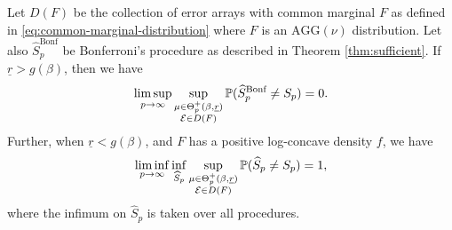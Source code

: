 \begin{corollary}
\label{cor:minimax-over-dependence}
Let $D(F)$ be the collection of error arrays with common marginal $F$ as defined in \eqref{eq:common-marginal-distribution} where $F$ is an $\text{AGG}(\nu)$ distribution.
Let also $\widehat{S}^{\text{Bonf}}_p$ be Bonferroni's procedure as described in Theorem \ref{thm:sufficient}.
If $\underline{r}>g(\beta)$, then we have
\begin{equation} \label{eq:minimax-over-dependence-over}
    \limsup_{p\to\infty} \sup_{\substack{\mu\in\Theta_p^+(\beta,\underline{r})\\ {\cal E}\in D(F)}} \P(\widehat{S}^{\text{Bonf}}_p \neq S_p) = 0.
\end{equation}
Further, when $\underline{r}<g(\beta)$, and $F$ has a positive log-concave density $f$, we have
\begin{equation} \label{eq:minimax-over-dependence-under}
    \liminf_{p\to\infty} \inf_{\widehat{S}_p} \sup_{\substack{\mu\in\Theta_p^+(\beta,\underline{r})\\ {\cal E}\in D(F)}} \P(\widehat{S}_p \neq S_p) = 
    1,
\end{equation}
where the infimum on $\widehat{S}_p$ is taken over all procedures.
\end{corollary}
